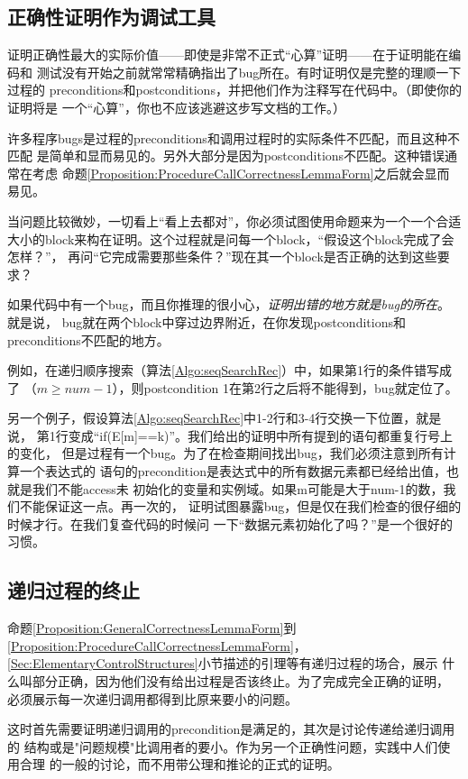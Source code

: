 \subsection{正确性证明作为调试工具}
证明正确性最大的实际价值——即使是非常不正式“心算”证明——在于证明能在编码和
测试没有开始之前就常常精确指出了bug所在。有时证明仅是完整的理顺一下过程的
preconditions和postconditions，并把他们作为注释写在代码中。（即使你的证明将是
一个“心算”，你也不应该逃避这步写文档的工作。）

许多程序bugs是过程的preconditions和调用过程时的实际条件不匹配，而且这种不匹配
是简单和显而易见的。另外大部分是因为postconditions不匹配。这种错误通常在考虑
命题\ref{Proposition:ProcedureCallCorrectnessLemmaForm}之后就会显而易见。

当问题比较微妙，一切看上“看上去都对”，你必须试图使用命题来为一个一个合适
大小的block来构在证明。这个过程就是问每一个block，“假设这个block完成了会怎样？”，
再问“它完成需要那些条件？”现在其一个block是否正确的达到这些要求？

如果代码中有一个bug，而且你推理的很小心，\emph{证明出错的地方就是bug的所在}。就是说，
bug就在两个block中穿过边界附近，在你发现postconditions和preconditions不匹配的地方。

例如，在递归顺序搜索（算法\ref{Algo:seqSearchRec}）中，如果第1行的条件错写成了
（$m \geq num-1$），则postcondition 1在第2行之后将不能得到，bug就定位了。

另一个例子，假设算法\ref{Algo:seqSearchRec}中1-2行和3-4行交换一下位置，就是说，
第1行变成“if(E[m]==k)”。我们给出的证明中所有提到的语句都重复行号上的变化，
但是过程有一个bug。为了在检查期间找出bug，我们必须注意到所有计算一个表达式的
语句的precondition是表达式中的所有数据元素都已经给出值，也就是我们不能access未
初始化的变量和实例域。如果m可能是大于num-1的数，我们不能保证这一点。再一次的，
证明试图暴露bug，但是仅在我们检查的很仔细的时候才行。在我们复查代码的时候问
一下“数据元素初始化了吗？”是一个很好的习惯。


\subsection{递归过程的终止}\label{Sec:TerminationOfRecursiveProcedures}
命题\ref{Proposition:GeneralCorrectnessLemmaForm}到\ref{Proposition:ProcedureCallCorrectnessLemmaForm}，
\ref{Sec:ElementaryControlStructures}小节描述的引理等有递归过程的场合，展示
什么叫部分正确，因为他们没有给出过程是否该终止。为了完成完全正确的证明，
必须展示每一次递归调用都得到比原来要小的问题。

这时首先需要证明递归调用的precondition是满足的，其次是讨论传递给递归调用的
结构或是"问题规模"比调用者的要小。作为另一个正确性问题，实践中人们使用合理
的一般的讨论，而不用带公理和推论的正式的证明。


